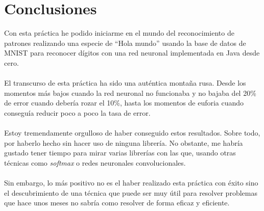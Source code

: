 \section{Conclusiones}

Con esta práctica he podido iniciarme en el mundo del reconocimiento de patrones realizando una especie de ``Hola mundo'' usando la base de datos de MNIST para reconocer dígitos con una red neuronal implementada en Java desde cero.
\\ \\
El transcurso de esta práctica ha sido una auténtica montaña rusa. Desde los momentos más bajos cuando la red neuronal no funcionaba y no bajaba del 20\% de error cuando debería rozar el 10\%, hasta los momentos de euforia cuando conseguía reducir poco a poco la tasa de error.
\\ \\
Estoy tremendamente orgulloso de haber conseguido estos resultados. Sobre todo, por haberlo hecho sin hacer uso de ninguna librería. No obstante, me habría gustado tener tiempo para mirar varias librerías con las que, usando otras técnicas como \textit{softmax} o redes neuronales convolucionales.
\\ \\
Sin embargo, lo más positivo no es el haber realizado esta práctica con éxito sino el descubrimiento de una técnica que puede ser muy útil para resolver problemas que hace unos meses no sabría como resolver de forma eficaz y eficiente.



\newpage



